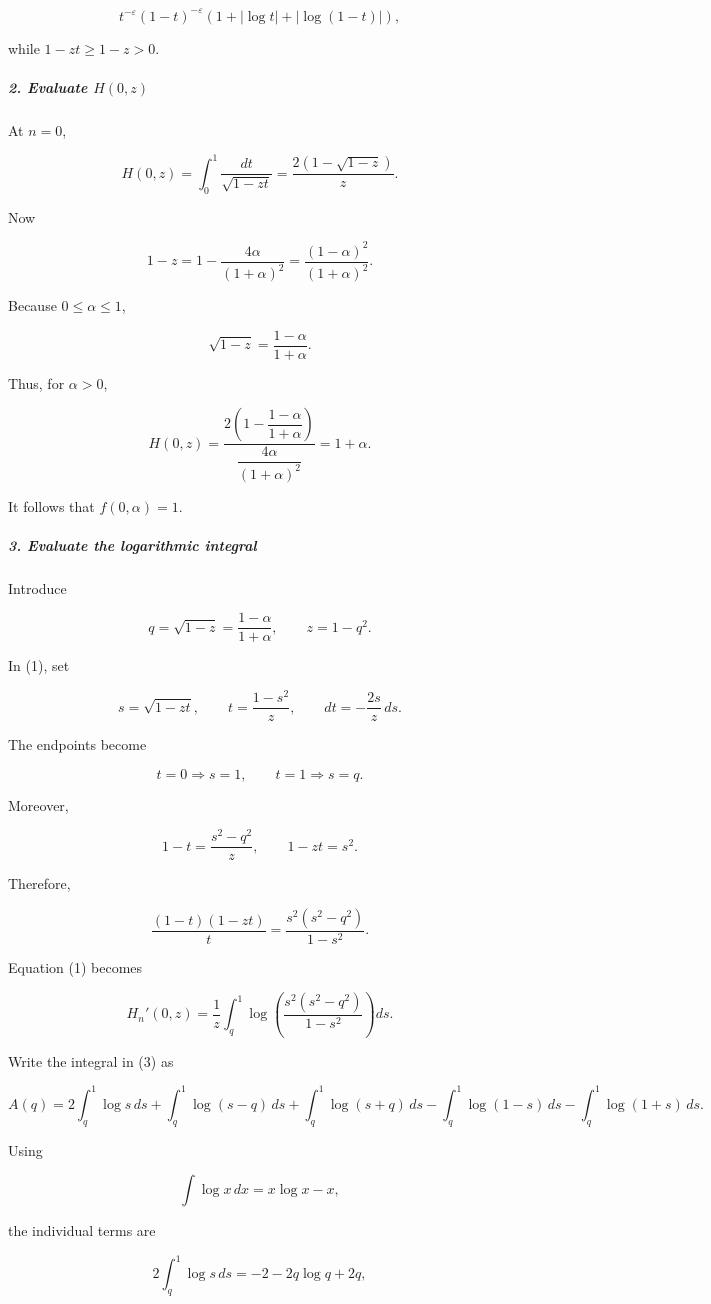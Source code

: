 \[
t^{-\varepsilon}(1-t)^{-\varepsilon} \left(1+|\log t|+|\log(1-t)|\right),
\]

while $1-zt\geq 1-z>0$.

\subparagraph*{2. Evaluate $H(0,z)$}

At $n=0$,

\[
H(0,z) = \int_0^1\frac{dt}{\sqrt{1-zt}} = \frac{2(1-\sqrt{1-z})}{z}.
\]

Now

\[
1-z = 1-\frac{4\alpha}{(1+\alpha)^2} = \frac{(1-\alpha)^2}{(1+\alpha)^2}.
\]

Because $0\leq\alpha\leq1$,

\[
\sqrt{1-z}=\frac{1-\alpha}{1+\alpha}.
\]

Thus, for $\alpha>0$,

\[
H(0,z) = \frac{ 2\left(1-\dfrac{1-\alpha}{1+\alpha}\right) }{ \dfrac{4\alpha}{(1+\alpha)^2} } =1+\alpha. \tag{2}
\]

It follows that $f(0,\alpha)=1$.

\subparagraph*{3. Evaluate the logarithmic integral}

Introduce

\[
q=\sqrt{1-z}=\frac{1-\alpha}{1+\alpha}, \qquad z=1-q^2.
\]

In (1), set

\[
s=\sqrt{1-zt}, \qquad t=\frac{1-s^2}{z}, \qquad dt=-\frac{2s}{z}\,ds.
\]

The endpoints become

\[
t=0\Longrightarrow s=1, \qquad t=1\Longrightarrow s=q.
\]

Moreover,

\[
1-t=\frac{s^2-q^2}{z}, \qquad 1-zt=s^2.
\]

Therefore,

\[
\frac{(1-t)(1-zt)}{t} = \frac{s^2(s^2-q^2)}{1-s^2}.
\]

Equation (1) becomes

\[
H_n'(0,z) = \frac1z \int_q^1 \log\left( \frac{s^2(s^2-q^2)}{1-s^2} \right)ds. \tag{3}
\]

Write the integral in (3) as

\[
A(q)= 2\int_q^1\log s\,ds +\int_q^1\log(s-q)\,ds +\int_q^1\log(s+q)\,ds -\int_q^1\log(1-s)\,ds -\int_q^1\log(1+s)\,ds.
\]

Using

\[
\int \log x\,dx=x\log x-x,
\]

the individual terms are

\[
2\int_q^1\log s\,ds = -2-2q\log q+2q,
\]

